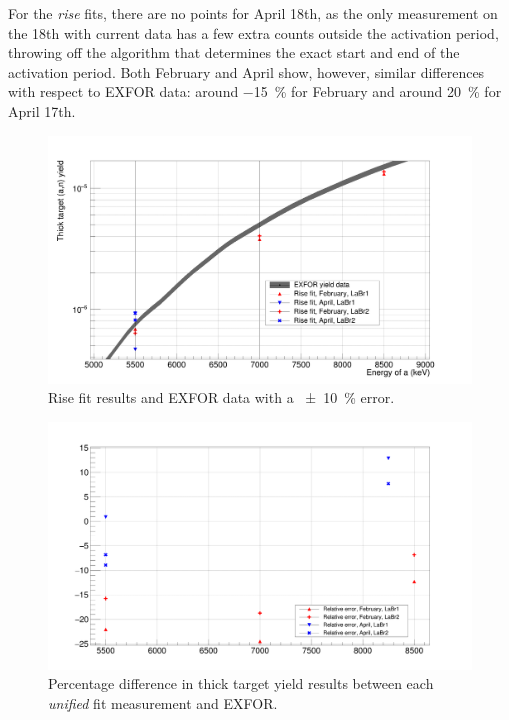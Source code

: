 \documentclass[a4paper,12pt]{report}
\begin{document}
For the \textit{rise} fits, there are no points for April 18th, as the only measurement on the 18th with current data has a few extra counts outside the activation period, throwing off the algorithm that determines the exact start and end of the activation period.
Both February and April show, however, similar differences with respect to EXFOR data: around \qty{-15}{\percent} for February and around \qty{+20}{\percent} for April 17th.

\begin{figure}[H]
	\centering
	\includegraphics[width=\textwidth]{reactions_v_energy_rise.png}
	\caption{Rise fit results and EXFOR data with a \qty{\pm 10}{\percent} error.}
	\label{reactions_v_energy_rise}
\end{figure}

\begin{figure}[H]
	\centering
	\includegraphics[width=\textwidth]{unified_errors_per.png}
	\caption{Percentage difference in thick target yield results between each \textit{unified} fit measurement and EXFOR.}
	\label{unified_errors_per}
\end{figure}
\end{document}

